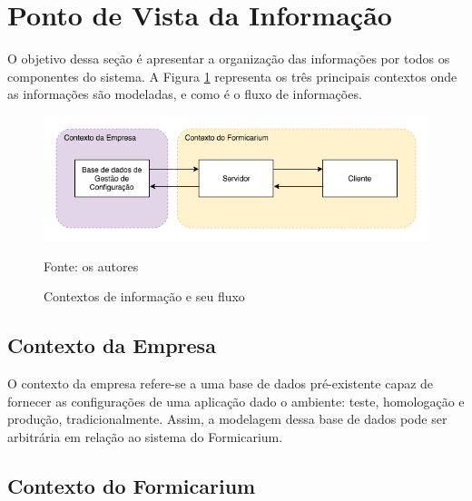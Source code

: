 \documentclass[twosideprint]{politex}
\newcommand{\legend}[1]{\begin{center}\def\caption{}\caption{#1}\end{center}}
\begin{document}
	\section{Ponto de Vista da Informação}
	    O objetivo dessa seção é apresentar a organização das informações por todos os componentes do sistema. A Figura \ref{fig:info-contexts} representa os três principais contextos onde as informações são modeladas, e como é o fluxo de informações. 
	    \begin{figure}[htb]
    	    \centering
    	    \caption{Contextos de informação e seu fluxo}
    	    \includegraphics[scale=0.67]{pictures/especificacao-de-requisitos/information-contexts.png}
    	    \legend{Fonte: os autores}
    	    \label{fig:info-contexts}
	    \end{figure}
	    \subsection{Contexto da Empresa}
	        O contexto da empresa refere-se a uma base de dados pré-existente capaz de fornecer as configurações de uma aplicação dado o ambiente: teste, homologação e produção, tradicionalmente. Assim, a modelagem dessa base de dados pode ser arbitrária em relação ao sistema do Formicarium.
	    \subsection{Contexto do Formicarium}
\end{document}
